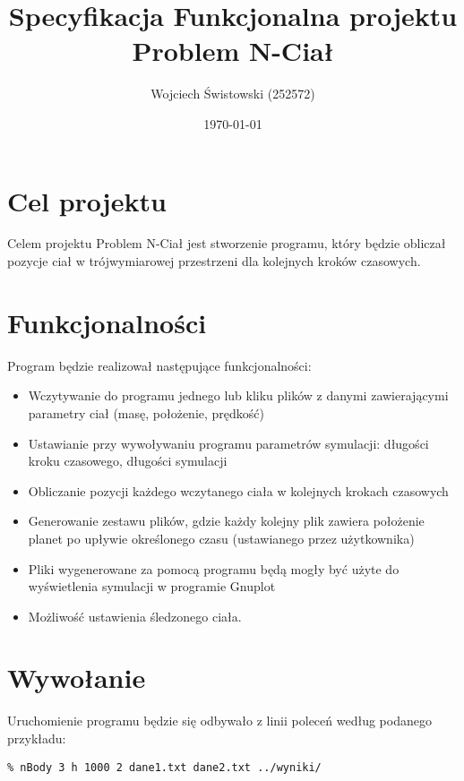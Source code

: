 \documentclass[a4paper,11pt,notitlepage]{article}
\author{Wojciech Świstowski (252572)}
\title{Specyfikacja Funkcjonalna projektu Problem N-Ciał}
\date{\today}
\begin{document}
\maketitle

\section{Cel projektu}

Celem projektu Problem N-Ciał jest stworzenie programu, który będzie obliczał pozycje ciał w trójwymiarowej przestrzeni dla kolejnych kroków czasowych.

\section{Funkcjonalności}
Program będzie realizował następujące funkcjonalności:
\begin{itemize}[noitemsep]
	\item Wczytywanie do programu jednego lub kliku plików z danymi zawierającymi parametry ciał (masę, położenie, prędkość)
	\item Ustawianie przy wywoływaniu programu parametrów symulacji: długości kroku czasowego, długości symulacji
	\item Obliczanie pozycji każdego wczytanego ciała w kolejnych krokach czasowych
	\item Generowanie zestawu plików, gdzie każdy kolejny plik zawiera położenie planet po upływie określonego czasu (ustawianego przez użytkownika)
	\item Pliki wygenerowane za pomocą programu będą mogły być użyte do wyświetlenia symulacji w programie Gnuplot
	\item Możliwość ustawienia śledzonego ciała.
\end{itemize}

\section{Wywołanie}
Uruchomienie programu będzie się odbywało z linii poleceń według podanego przykładu:

\footnotesize\begin{verbatim}
% nBody 3 h 1000 2 dane1.txt dane2.txt ../wyniki/
\end{verbatim}\normalsize
\end{document}
